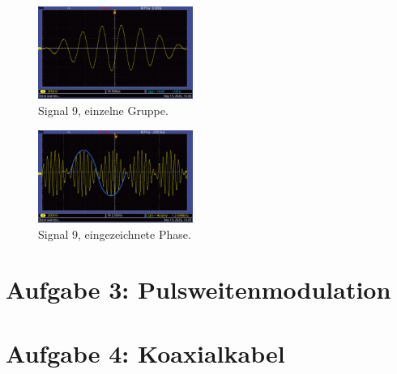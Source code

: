 \begin{figure} [h!]
    \centering
        \includegraphics[width=0.45\textwidth]{img/25/Signale2/Signal9-einzeln.pdf}
    \caption{Signal 9, einzelne Gruppe.}
\end{figure}

\begin{figure} [h!]
    \centering
        \includegraphics[width=0.45\textwidth]{img/25/Signale2/Signal9-Sin-eingezeichnet.pdf}
    \caption{Signal 9, eingezeichnete Phase.}
\end{figure}

\section{Aufgabe 3: Pulsweitenmodulation}

\section{Aufgabe 4: Koaxialkabel}